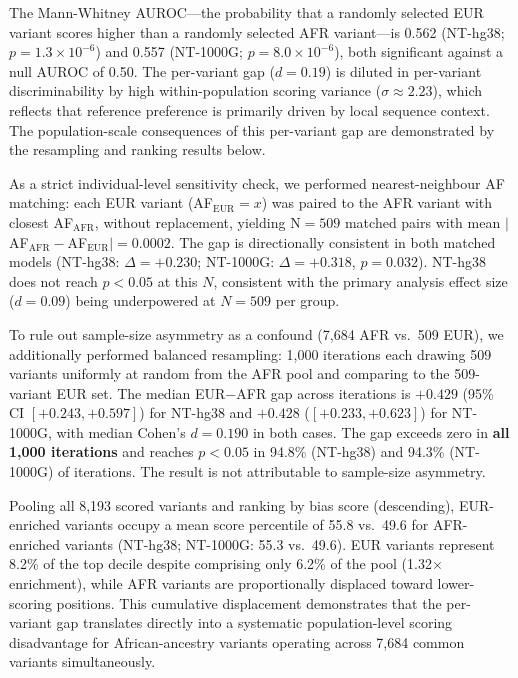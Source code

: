 \documentclass[conference]{IEEEtran}
\begin{document}
The Mann-Whitney AUROC---the probability that a randomly selected EUR variant
scores higher than a randomly selected AFR variant---is 0.562 (NT-hg38;
$p{=}1.3{\times}10^{-6}$) and 0.557 (NT-1000G; $p{=}8.0{\times}10^{-6}$),
both significant against a null AUROC of 0.50. The per-variant gap ($d{=}0.19$)
is diluted in per-variant discriminability by high within-population scoring
variance ($\sigma{\approx}2.23$), which reflects that reference preference is
primarily driven by local sequence context. The population-scale consequences of this per-variant gap are
demonstrated by the resampling and ranking results below.

As a strict individual-level sensitivity check, we performed nearest-neighbour
AF matching: each EUR variant (AF$_\text{EUR}{=}x$) was paired to the AFR
variant with closest AF$_\text{AFR}$, without replacement, yielding N$=509$
matched pairs with mean $|$AF$_\text{AFR}{-}$AF$_\text{EUR}|{=}0.0002$. The
gap is directionally consistent in both matched models (NT-hg38:
$\Delta{=}{+}0.230$; NT-1000G: $\Delta{=}{+}0.318$, $p{=}0.032$). NT-hg38
does not reach $p{<}0.05$ at this $N$, consistent with the primary analysis
effect size ($d{=}0.09$) being underpowered at $N{=}509$ per group.

To rule out sample-size asymmetry as a confound (7,684 AFR vs.\ 509 EUR),
we additionally performed balanced resampling: 1,000 iterations each drawing
509 variants uniformly at random from the AFR pool and comparing to the
509-variant EUR set.
The median EUR$-$AFR gap across iterations is $+0.429$
(95\% CI $[{+}0.243,{+}0.597]$) for NT-hg38 and $+0.428$
($[{+}0.233,{+}0.623]$) for NT-1000G, with median Cohen's $d{=}0.190$ in both
cases. The gap exceeds zero in \textbf{all 1,000 iterations} and reaches
$p{<}0.05$ in 94.8\% (NT-hg38) and 94.3\% (NT-1000G) of iterations. The result
is not attributable to sample-size asymmetry.

Pooling all 8,193 scored variants and ranking by bias score (descending),
EUR-enriched variants occupy a mean score percentile of 55.8 vs.\ 49.6 for
AFR-enriched variants (NT-hg38; NT-1000G: 55.3 vs.\ 49.6). EUR variants
represent 8.2\% of the top decile despite comprising only 6.2\% of the pool
(1.32$\times$ enrichment), while AFR variants are proportionally displaced
toward lower-scoring positions. This cumulative displacement demonstrates that the per-variant gap
translates directly into a systematic population-level scoring disadvantage
for African-ancestry variants operating across 7,684 common variants simultaneously.
\end{document}
